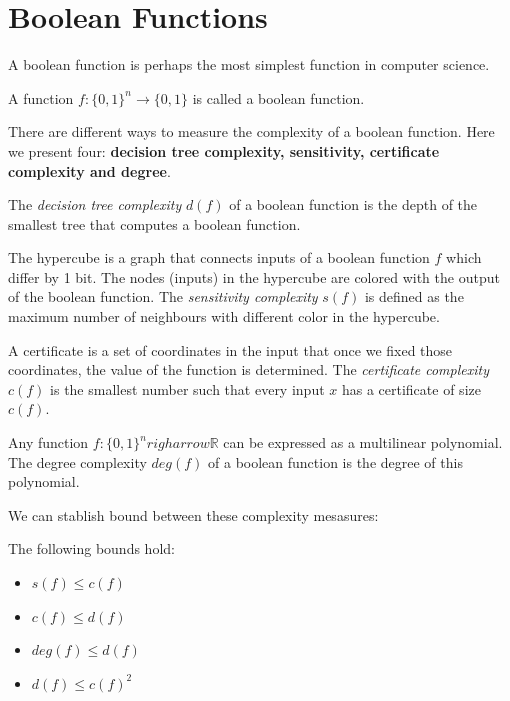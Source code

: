 \section{Boolean Functions}
A boolean function is perhaps the most simplest function in computer science.

\begin{definition}
A function $f:\{0,1\}^n \rightarrow \{0,1\}$ is called a boolean function.
\end{definition}

There are different ways to measure the complexity of a boolean function. 
Here we present four: \textbf{decision tree complexity, sensitivity, certificate complexity and degree}.

\begin{definition}
The \textit{decision tree complexity} $d(f)$ of a boolean function is the depth of the smallest tree that computes a boolean function.
\end{definition}

\begin{definition}[Sensitivity]
    The hypercube is a graph that connects inputs of a boolean function $f$ which differ by 1 bit. 
    The nodes (inputs) in the hypercube are colored with the output of the boolean function.
    The \textit{sensitivity complexity} $s(f)$ is defined as the maximum number of neighbours with different color in the hypercube.
\end{definition}

\begin{definition}
A certificate is a set of coordinates in the input that once we fixed those coordinates, the value of the function
is determined. The \textit{certificate complexity} $c(f)$ is the smallest number such that every input $x$ has a certificate
of size $c(f)$.  
\end{definition}

\begin{definition}
Any function $f:\{0,1\}^n righarrow \mathbb{R}$ can be expressed as a multilinear polynomial. The degree complexity 
$deg(f)$ of a boolean function is the degree of this polynomial.
\end{definition}

We can stablish bound between these complexity mesasures:

\begin{proposition}
    The following bounds hold:
    \begin{itemize}
        \item $s(f) \leq c(f)$
        \item $c(f) \leq d(f)$
        \item $deg(f) \leq d(f)$
        \item $d(f) \leq c(f)^2$
    \end{itemize}
\end{proposition}


